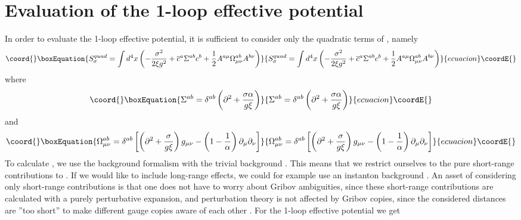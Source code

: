 \documentclass[a4paper,12pt]{article}
\providecommand{\sect}[1]{ \section{#1} \setcounter{equation}{0} }
\begin{document}
\sect{Evaluation of the 1-loop effective potential}

\label{sec5} In order to evaluate the 1-loop effective potential, it is
sufficient to consider only the quadratic terms of \coordHE{}, namely
\begin{equation}\coord{}\boxEquation{
S_{\sigma }^{quad}=\int d^{4}x\left( -\frac{\sigma ^{2}}{2\xi g^{2}}+
\overline{c}^{a}\Sigma ^{ab}c^{b}+\frac{1}{2}A^{a\mu }\Omega _{\mu \nu
}^{ab}A^{b\nu }\right)   \label{sseff}
}{
S_{\sigma }^{quad}=\int d^{4}x\left( -\frac{\sigma ^{2}}{2\xi g^{2}}+
\overline{c}^{a}\Sigma ^{ab}c^{b}+\frac{1}{2}A^{a\mu }\Omega _{\mu \nu
}^{ab}A^{b\nu }\right)   }{ecuacion}\coordE{}\end{equation}
where
\begin{equation}\coord{}\boxEquation{
\Sigma ^{ab}=\delta ^{ab}\left( \partial ^{2}+\frac{\sigma \alpha }{g\xi }
\right)   \label{sab}
}{
\Sigma ^{ab}=\delta ^{ab}\left( \partial ^{2}+\frac{\sigma \alpha }{g\xi }
\right)   }{ecuacion}\coordE{}\end{equation}
and
\begin{equation}\coord{}\boxEquation{
\Omega _{\mu \nu }^{ab}=\delta ^{ab}\left[ \left( \partial ^{2}+\frac{\sigma
}{g\xi }\right) g_{\mu \nu }-\left( 1-\frac{1}{\alpha }\right) \partial
_{\mu }\partial _{\nu }\right]   \label{omab}
}{
\Omega _{\mu \nu }^{ab}=\delta ^{ab}\left[ \left( \partial ^{2}+\frac{\sigma
}{g\xi }\right) g_{\mu \nu }-\left( 1-\frac{1}{\alpha }\right) \partial
_{\mu }\partial _{\nu }\right]   }{ecuacion}\coordE{}\end{equation}
To calculate \coordHE{}, we use the background formalism with the trivial
background \coordHE{}. This means that we restrict ourselves to the pure
short-range contributions to \coordHE{}. If we
would like to include long-range effects, we could for example use an
instanton background \cite{Boucaud:2002nc}. An asset of considering only
short-range contributions is that one does not have to worry about Gribov
ambiguities, since these short-range contributions are calculated with a
purely perturbative expansion, and perturbation theory is not affected by
Gribov copies, since the considered distances are ''too short'' to make
different gauge copies aware of each other \cite
{Williams:2002nq,Williams:2002dw,Frishman:1978ke,Frishman:gy}.\newline
\newline
For the 1-loop effective potential we get
\end{document}
